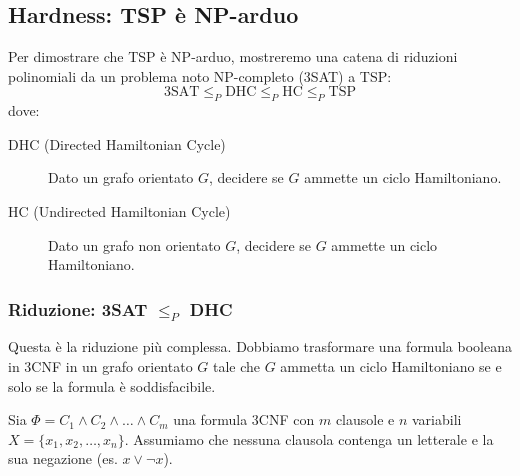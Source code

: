 \documentclass[a4paper]{article}
\theoremstyle{definition} %
\begin{document}
\subsection{Hardness: TSP è NP-arduo}

Per dimostrare che TSP è NP-arduo, mostreremo una catena di riduzioni polinomiali da un problema noto $\text{NP}$-completo (3SAT) a TSP:
$$ \text{3SAT} \le_P \text{DHC} \le_P \text{HC} \le_P \text{TSP} $$
dove:
\begin{description}
    \item[DHC (Directed Hamiltonian Cycle)] Dato un grafo orientato $G$, decidere se $G$ ammette un ciclo Hamiltoniano.
    \item[HC (Undirected Hamiltonian Cycle)] Dato un grafo non orientato $G$, decidere se $G$ ammette un ciclo Hamiltoniano.
\end{description}

\subsubsection{Riduzione: 3SAT $\le_P$ DHC}

Questa è la riduzione più complessa. Dobbiamo trasformare una formula booleana in 3CNF in un grafo orientato $G$ tale che $G$ ammetta un ciclo Hamiltoniano se e solo se la formula è soddisfacibile.

Sia $\Phi = C_1 \land C_2 \land \dots \land C_m$ una formula 3CNF con $m$ clausole e $n$ variabili $X = \{x_1, x_2, \dots, x_n\}$. Assumiamo che nessuna clausola contenga un letterale e la sua negazione (es. $x \lor \neg x$).
\end{document}
